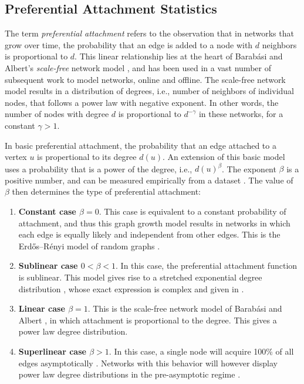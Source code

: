 \documentclass{article}
\begin{document}
\subsection{Preferential Attachment Statistics}
The term \emph{preferential attachment} refers to the observation that
in networks that grow over time, the probability that an edge is added
to a node with $d$ neighbors is proportional to $d$.  This linear
relationship lies at the heart of Barabási and Albert's
\emph{scale-free} network model \citep{b439}, and has been used in a vast
number of subsequent work to model networks, online and offline. The
scale-free network model results in a distribution of degrees, i.e.,
number of neighbors of individual nodes, that follows a power law with
negative exponent. In other words, the number of nodes with degree $d$ is
proportional to $d^{-\gamma}$ in these networks, for a constant
$\gamma>1$.

In basic preferential attachment, the probability that an edge
attached to a vertex $u$ is propertional to its degree $d(u)$.  An
extension of this basic model uses a probability that is a power of the
degree, i.e., $d(u)^\beta$.  The exponent $\beta$ is a positive number,
and can be measured empirically from a dataset
\citep{kunegis:preferential-attachment}.  The value of $\beta$ then
determines the type of preferential attachment:
\begin{enumerate}
\item \textbf{Constant case $\beta=0$}.  
This case is equivalent to a constant probability of attachment, 
and thus this graph growth model results in networks in which each edge
is equally likely and independent from other edges.  This is the
Erdős--Rényi model of random graphs \citep{b569}. 

\item \textbf{Sublinear case $0 < \beta < 1$}. 
In this case, the preferential attachment function is sublinear.  This
model gives rise to a stretched exponential degree distribution
\citep{b764}, whose exact 
expression is complex and given in \citep[Eq. 94]{b773}. 

\item \textbf{Linear case $\beta=1$}.
This is the scale-free network model of Barabási and Albert
\citep{b439}, in which attachment is proportional to the degree. This gives a
power law degree distribution.  

\item \textbf{Superlinear case $\beta > 1$}.
In this case, a single node will acquire 100\% of all edges
asymptotically \citep{b765}. Networks with this behavior will however display
power law degree distributions in the pre-asymptotic regime
\citep{b769}. 
\end{enumerate}
\end{document}
